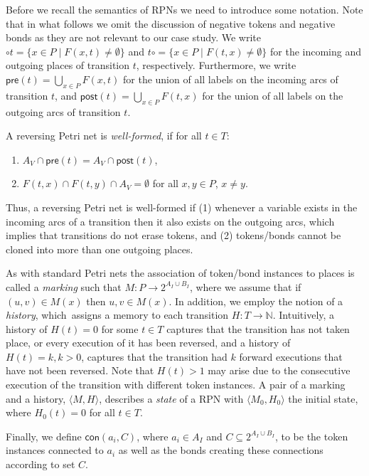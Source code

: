 \documentclass[runningheads]{llncs}
\newcommand{\PN}{reversing Petri net }
\newcommand{\guard}[1]{\mathsf{pre}(#1)}
\newcommand{\effects}[1]{\mathsf{post}(#1)}
\newcommand{\connected}{\mathsf{con}}
\newcommand{\state}[2]{\langle {#1}, {#2}\rangle}
\begin{document}
Before we recall the semantics of RPNs we need to introduce some notation. Note that in 
what follows we omit the discussion of negative tokens and negative bonds as they are not relevant to our
case study.  
We write 
$\circ t =   \{x\in P\mid  F(x,t)\neq \emptyset\}$ and  
$ t\circ = \{x\in P\mid F(t,x)\neq \emptyset\}$
for the incoming and outgoing places of transition
$t$, respectively. Furthermore, we write
$\guard{t}  =   \bigcup_{x\in P} F(x,t)$ 
for the union of all labels on the
incoming arcs of  transition $t$, 
and $\effects{t}  =   \bigcup_{x\in P} F(t,x)$
for the union of all labels on the 
outgoing arcs of transition $t$. 
\begin{definition}\label{well-formed}{\rm 
		A \PN is \emph{well-formed}, if for all $t\in T$:
		\begin{enumerate}
			\item $A_V\cap \guard{t} = A_V\cap \effects{t}$,
			\item $ F(t,x)\cap F(t,y)\cap A_V=\emptyset$ for all $x,y\in P$, $x\neq y $. 
		\end{enumerate}
}\end{definition}
Thus, a \PN is well-formed if (1) whenever a variable exists in
the incoming arcs of a transition then it also exists on the outgoing arcs, which implies that transitions do not
erase tokens, and  (2) 
tokens/bonds cannot be cloned into more than one outgoing places.

As with standard Petri nets the association of token/bond instances to places is called a \emph{marking}  such that 
$M: P\rightarrow 2^{A_I\cup B_I}$, where we assume that if $(u,v)\in M(x)$ then $u, v\in M(x)$. 
In addition, we employ the notion of a \emph{history}, which~assigns a memory to each
transition $H : T\rightarrow \mathbb{N}$. 
Intuitively, a history of $H(t) = 0$ for some $t \in T$ captures that the transition has not taken place, or 
every execution of it has been reversed, and a history
of $ H(t)=k, k>0$, captures that the transition had $k$ forward executions that have not been  reversed.
Note that $H(t)>1$ may
arise due to the consecutive execution of the transition with different token
instances. A pair of a marking and a history, $\state{M}{H}$, describes a \emph{state} of a RPN 
with $\state{M_0}{H_0}$ the initial state, where $H_0(t) = 0$ for all $t\in T$. 

Finally, we define $\connected(a_i,C)$, where $a_i\in A_I$ and $C\subseteq 2^{A_I\cup B_I}$,
to be the token instances connected
to $a_i$  as well as the bonds creating these connections according to 
set $C$. 
\end{document}
